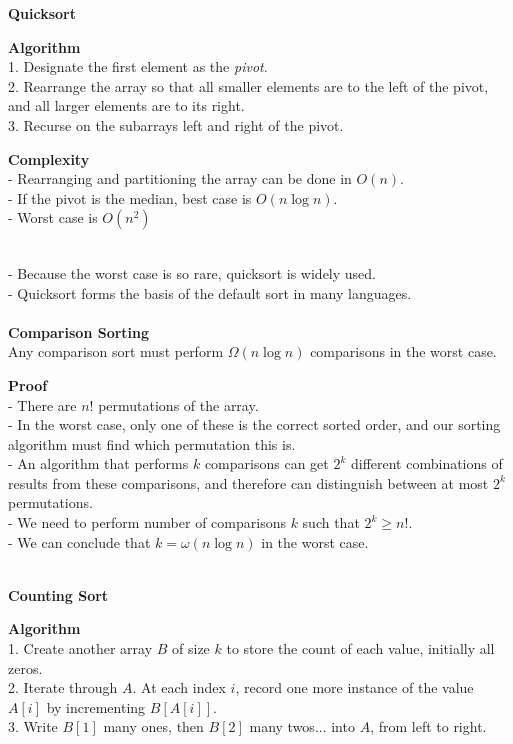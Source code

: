 \documentclass{article}
\begin{document}
\textbf{Quicksort}
\\
\begin{tcolorbox}
    \textbf{Algorithm} \\
    1. Designate the first element as the \emph{pivot}. \\
    2. Rearrange the array so that all smaller elements are to the left of the pivot, and all larger elements are to its right. \\
    3. Recurse on the subarrays left and right of the pivot.
\end{tcolorbox}
\begin{tcolorbox}
    \textbf{Complexity} \\
    - Rearranging and partitioning the array can be done in $O(n)$. \\
    - If the pivot is the median, best case is $O(n \log n)$. \\
    - Worst case is $O(n^{2})$
\end{tcolorbox}
~\\
- Because the worst case is so rare, quicksort is widely used. \\
- Quicksort forms the basis of the default sort in many languages.
\\\\
\textbf{Comparison Sorting}
\\
Any comparison sort must perform $\Omega(n \log n)$ comparisons in the worst case.
\\
\begin{tcolorbox}
    \textbf{Proof} \\
    - There are $n!$ permutations of the array. \\
    - In the worst case, only one of these is the correct sorted order, and our sorting algorithm must find which permutation this is. \\
    - An algorithm that performs $k$ comparisons can get $2^{k}$ different combinations of results from these comparisons, and therefore can distinguish between at most $2^{k}$ permutations. \\
    - We need to perform number of comparisons $k$ such that $2^{k} \geq n!$. \\
    - We can conclude that $k = \omega(n \log n)$ in the worst case.
\end{tcolorbox}
~\\
\textbf{Counting Sort}
\\
\begin{tcolorbox}
    \textbf{Algorithm} \\
    1. Create another array $B$ of size $k$ to store the count of each value, initially all zeros. \\
    2. Iterate through $A$. At each index $i$, record one more instance of the value $A[i]$ by incrementing $B[A[i]]$. \\
    3. Write $B[1]$ many ones, then $B[2]$ many twos... into $A$, from left to right.
\end{tcolorbox}
\end{document}
